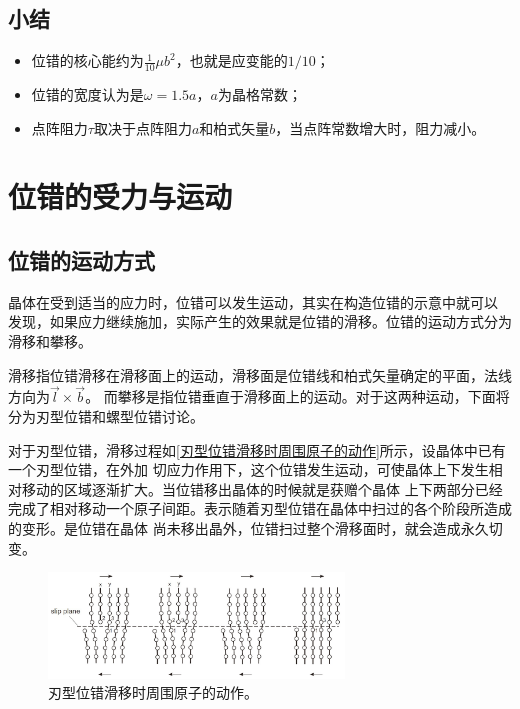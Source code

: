             \subsection{小结}
                \begin{itemize}
                    \item 位错的核心能约为$\frac{1}{10}\mu b^2$，也就是应变能的$1/10$；
                    \item 位错的宽度认为是$\omega=1.5a$，$a$为晶格常数；
                    \item 点阵阻力$\tau$取决于点阵阻力$a$和柏式矢量$b$，当点阵常数增大时，阻力减小。
                \end{itemize}
        \section{位错的受力与运动}
            \subsection{位错的运动方式}
                晶体在受到适当的应力时，位错可以发生运动，其实在构造位错的示意中就可以
                发现，如果应力继续施加，实际产生的效果就是位错的滑移。位错的运动方式分为
                滑移和攀移。

                滑移指位错滑移在滑移面上的运动，滑移面是位错线和柏式矢量确定的平面，法线方向为$\vec{l}\times \vec{b}$。
                而攀移是指位错垂直于滑移面上的运动。对于这两种运动，下面将分为刃型位错和螺型位错讨论。

                对于刃型位错，滑移过程如\autoref{刃型位错滑移时周围原子的动作}所示，设晶体中已有一个刃型位错，在外加
                切应力作用下，这个位错发生运动，可使晶体上下发生相对移动的区域逐渐扩大。当位错移出晶体的时候就是获赠个晶体
                上下两部分已经完成了相对移动一个原子间距。表示随着刃型位错在晶体中扫过的各个阶段所造成的变形。是位错在晶体
                尚未移出晶外，位错扫过整个滑移面时，就会造成永久切变。
                \begin{figure}[ht]
                    \centering
                    \includegraphics[width=0.7\textwidth]{fig/movement_of_edge_dislocation.jpg}
                    \caption{刃型位错滑移时周围原子的动作。}
                    \label{刃型位错滑移时周围原子的动作}
                \end{figure}
                
